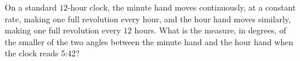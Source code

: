 On a standard $12$-hour clock, the minute hand moves continuously, at a constant rate, making one full revolution every hour, and the hour hand moves similarly, making one full revolution every $12$ hours. What is the measure, in degrees, of the smaller of the two angles between the minute hand and the hour hand when the clock reads 5:42?
